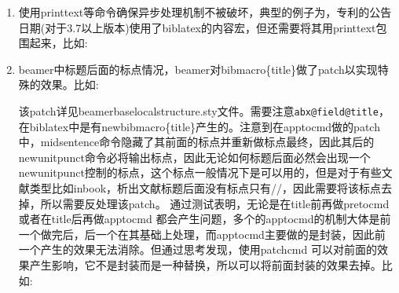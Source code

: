 \begin{enumerate}
    \item 使用printtext等命令确保异步处理机制不被破坏，典型的例子为，专利的公告日期(对于3.7以上版本)使用了biblatex的内容宏，但还需要将其用printtext包围起来，比如:
        \begin{texlist}
        \end{texlist}

    \item beamer中标题后面的标点情况，beamer对bibmacro\{title\}做了patch以实现特殊的效果。比如:
    \begin{texlist}
    \pretocmd{\abx@macro@title}
       {%
        \bbx@tempa\newblock\unspace{}}{}{}
    \apptocmd{\abx@macro@title}
       {
        \newblock\unspace{}}{}{}
    \end{texlist}
    该patch详见beamerbaselocalstructure.sty文件。需要注意\verb|abx@field@title|，在biblatex中是有newbibmacro\{title\}产生的。注意到在apptocmd做的patch中，midsentence命令隐藏了其前面的标点并重新做标点最终，因此其后的newunitpunct命令必将输出标点，因此无论如何标题后面必然会出现一个newunitpunct控制的标点，这个标点一般情况下是可以用的，但是对于有些文献类型比如inbook，析出文献标题后面没有标点只有//，因此需要将该标点去掉，所以需要反处理该patch。
    通过测试表明，无论是在title前再做pretocmd或者在title后再做apptocmd 都会产生问题，多个的apptocmd的机制大体是前一个做完后，后一个在其基础上处理，而apptocmd主要做的是封装，因此前一个产生的效果无法消除。但通过思考发现，使用patchcmd 可以对前面的效果产生影响，它不是封装而是一种替换，所以可以将前面封装的效果去掉。比如:
    \begin{texlist}
      {%
      }
    \end{texlist}

  \end{enumerate}


